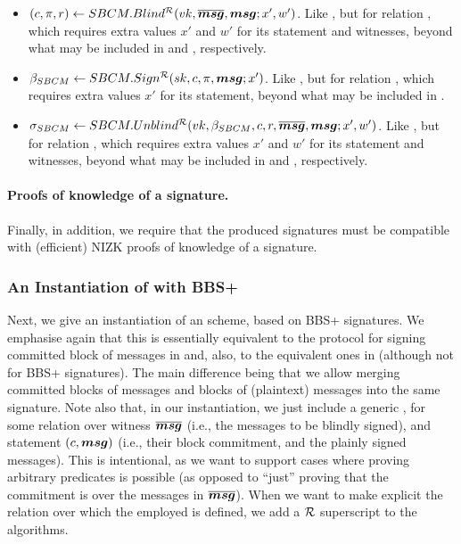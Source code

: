 \begin{itemize}
\item $(c,\pi,r) \gets SBCM.Blind^\mathcal{R}(vk,\overline{\boldsymbol{msg}},\boldsymbol{msg};x',w')$. Like
  \SBCMBlind, but for relation \NIZKRel, which requires extra values $x'$ and
  $w'$ for its statement and witnesses, beyond what may be included in \smsg and
  \osmsg, respectively.
\item $\beta_{SBCM} \gets SBCM.Sign^\mathcal{R}(sk,c,\pi,\boldsymbol{msg};x')$. Like
  \SBCMSign, but for relation \NIZKRel, which requires extra values $x'$
  for its statement, beyond what may be included in \smsg.
\item $\sigma_{SBCM} \gets SBCM.Unblind^\mathcal{R}(vk,\beta_{SBCM},c,r,\overline{\boldsymbol{msg}},\boldsymbol{msg};
  x',w')$. Like \SBCMUnblind, but for relation \NIZKRel, which requires extra
  values $x'$ and $w'$ for its statement and witnesses, beyond what may be
  included in \smsg and \osmsg, respectively.
\end{itemize}

\paragraph{Proofs of knowledge of a \SBCM signature.} %
Finally, in addition, we require that the produced signatures must be compatible
with (efficient) NIZK proofs of knowledge of a signature.

\subsubsection{An Instantiation of \SBCM with BBS+}

Next, we give an instantiation of an \SBCM scheme, based on BBS+ signatures.
We emphasise again that this is essentially equivalent to the protocol for
signing committed block of messages in \cite{asm06} and, also, to the equivalent
ones in \cite{cl02,ps16} (although not for BBS+ signatures). The main difference
being that we allow merging committed blocks of messages and blocks of
(plaintext) messages into the same signature.
%
Note also that, in our instantiation, we just include a generic \NIZK, for some
relation over witness $\overline{\boldsymbol{msg}}$ (i.e., the messages to be blindly
signed), and statement $(c,\boldsymbol{msg})$ (i.e., their block commitment, and the
plainly signed messages). This is intentional, as we want to support cases where
proving arbitrary predicates is possible (as opposed to ``just'' proving that
the commitment is over the messages in $\overline{\boldsymbol{msg}}$).
%
When we want to make explicit the relation over which the employed \NIZK is
defined, we add a $\mathcal{R}$ superscript to the algorithms.

